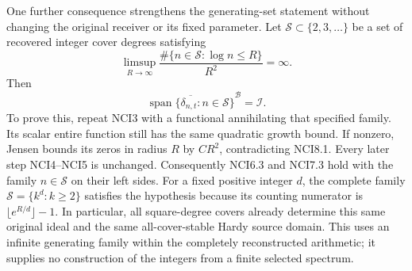 One further consequence strengthens the generating-set statement without
changing the original receiver or its fixed parameter. Let
\(\mathscr S\subset\{2,3,\ldots\}\) be a set of recovered integer cover
degrees satisfying \[
\limsup_{R\to\infty}
\frac{\#\{n\in\mathscr S:\log n\le R\}}{R^2}=\infty.
\tag{NCI8.1}
\] Then \[
\overline{\operatorname{span}\{\delta_{n,t}:n\in\mathscr S\}}^{\mathcal B}
=\mathcal I.
\tag{NCI8.2}
\] To prove this, repeat NCI3 with a functional annihilating that
specified family. Its scalar entire function still has the same
quadratic growth bound. If nonzero, Jensen bounds its zeros in radius
\(R\) by \(CR^2\), contradicting NCI8.1. Every later step NCI4--NCI5 is
unchanged. Consequently NCI6.3 and NCI7.3 hold with the family
\(n\in\mathscr S\) on their left sides. For a fixed positive integer
\(d\), the complete family \(\mathscr S=\{k^d:k\ge2\}\) satisfies the
hypothesis because its counting numerator is
\(\lfloor e^{R/d}\rfloor-1\). In particular, all square-degree covers
already determine this same original ideal and the same all-cover-stable
Hardy source domain. This uses an infinite generating family within the
completely reconstructed arithmetic; it supplies no construction of the
integers from a finite selected spectrum.
